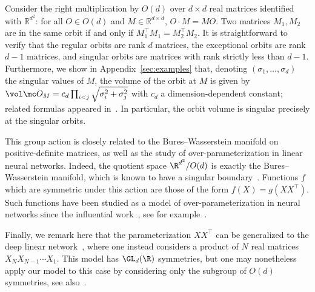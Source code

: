 \documentclass[twoside,a4paper,11pt]{article}
\theoremstyle{plain}
\begin{document}
\begin{example}
\label{ex:bures--wasserstein}
Consider the right multiplication by $O(d)$ over 
$d\times d$ real matrices identified with $\mathbb{R}^{d^2}$: for all $O \in O(d)$ and $M \in \mathbb{R}^{d\times d}$, $O \cdot M = M O$. Two matrices $M_1, M_2$ are in the same orbit if and only if $M_1^\top M_1 = M_2^\top M_2$.
It is straightforward to verify that the
regular orbits are rank $d$ matrices,
the exceptional orbits are rank $d - 1$
matrices, and singular orbits
are matrices with rank strictly less than $d -1$.
 Furthermore, we show in Appendix~\ref{sec:examples} that, denoting $(\sigma_1, \ldots, \sigma_d)$ the singular values of $M$, the volume of the orbit at $M$ is given by $\vol \mc O_M = c_d \prod_{i<j} \sqrt{\sigma_i^2 + \sigma_j^2}$ with $c_d$ a dimension-dependent constant; related formulas appeared in~\cite{carne1990geometry,huang-cp,yu2023riemannian}.
 In particular, the orbit volume is singular precisely
 at the singular orbits.

 This group action is closely related to the
 Bures--Wasserstein manifold on
 positive-definite matrices, as well as the 
 study of over-parameterization in linear
 neural networks. Indeed,
 the quotient space
$\R^{d^2}/O(d)$ is exactly the Bures--Wasserstein
manifold, which is known
to have a singular boundary~\cite{massart2020quotient}.
Functions $f$ which are symmetric under this
action are those of the form $f(X) = g(XX^\top)$.
Such functions
have been studied as a model of over-parameterization
in neural networks since the influential
work~\cite{gunasekar2017implicit},
see for example~\cite{li2018algorithmic,arora2019implicit}.

Finally, we remark here that the
parameterization $XX^\top$ can be generalized to
the deep linear network~\cite{arora2018optimization},
where one instead considers
a product of $N$ real matrices 
$X_NX_{N-1}\cdots X_1$.
This model has $\GL_d(\R)$
symmetries, but one may nonetheless
apply our model to this case by considering
only the subgroup of $O(d)$ symmetries, see also~\cite{menon2025entropy}.
\end{example}






 
    
\end{document}
